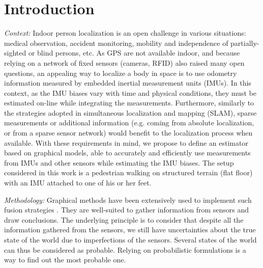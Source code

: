 
\section{Introduction}\label{sec:intro}

\textit{Context: }
Indoor person localization is an open challenge in various situations: 
medical observation, accident monitoring, mobility and independence of partially-sighted or blind persons, etc.
As GPS are not available indoor, and because relying on a network of fixed sensors (cameras, RFID) also raised many open questions, an appealing way to localize a body in space is to use odometry information measured by embedded inertial measurement units (IMUs).
In this context, as the IMU biases vary with time and physical conditions, they must be estimated on-line while integrating the measurements.
Furthermore, similarly to the strategies adopted in simultaneous localization and mapping (SLAM), sparse measurements or additional information (e.g. coming from absolute localization, or from a sparse sensor network) would benefit to the localization process when available.
With these requirements in mind, we propose to define an estimator based on graphical models, able to accurately and efficiently use measurements from IMUs and other sensors while estimating the IMU biases. %
The setup considered in this work  is a pedestrian walking on structured terrain (flat floor) with an IMU attached to one of his or her feet.

\textit{Methodology: }
Graphical methods have been extensively used to implement such fusion strategies \cite{Thrun:ijrr:2006,Kaess:itro:2008}.
They are well-suited to gather information from sensors
and draw conclusions. The underlying principle is to consider that despite all the information gathered from the sensors, we still have uncertainties about the true state of the world due to imperfections of the sensors.
Several states of the world can thus be considered as probable.
Relying on probabilistic formulations is a way to find out the most probable one. 

